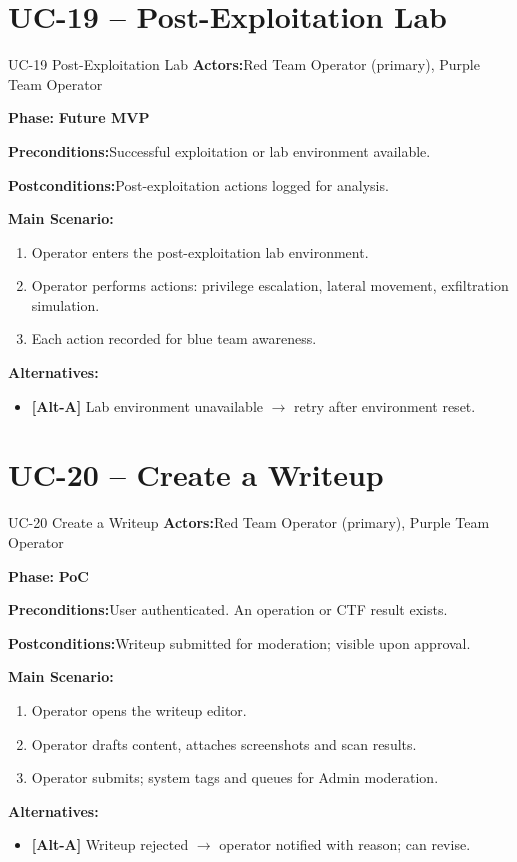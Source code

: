 \documentclass[12pt,a4paper]{report}
\newcommand{\ucfield}[2]{%
    \noindent\textbf{\color{helixpurplemid}#1:}\quad #2\par\medskip
}
\newcommand{\ucphase}[1]{%
    \noindent\textbf{\color{helixpurplemid}Phase:}\quad%
    \ifstrequal{#1}{PoC}{\textcolor{helixteal}{\textbf{PoC}}}{\textcolor{helixamber}{\textbf{Future MVP}}}%
    \par\medskip
}
\begin{document}
\section{UC-19 -- Post-Exploitation Lab}
\begin{ucbox}{UC-19 \quad Post-Exploitation Lab}
    \ucfield{Actors}{Red Team Operator (primary), Purple Team Operator}
    \ucphase{Future MVP}
    \ucfield{Preconditions}{Successful exploitation or lab environment available.}
    \ucfield{Postconditions}{Post-exploitation actions logged for analysis.}
    \textbf{\color{helixpurplemid}Main Scenario:}
    \begin{enumerate}
        \item Operator enters the post-exploitation lab environment.
        \item Operator performs actions: privilege escalation, lateral movement, exfiltration simulation.
        \item Each action recorded for blue team awareness.
    \end{enumerate}
    \textbf{\color{helixpurplemid}Alternatives:}
    \begin{itemize}
        \item \textbf{[Alt-A]} Lab environment unavailable $\rightarrow$ retry after environment reset.
    \end{itemize}
\end{ucbox}

\section{UC-20 -- Create a Writeup}
\begin{ucbox}{UC-20 \quad Create a Writeup}
    \ucfield{Actors}{Red Team Operator (primary), Purple Team Operator}
    \ucphase{PoC}
    \ucfield{Preconditions}{User authenticated. An operation or CTF result exists.}
    \ucfield{Postconditions}{Writeup submitted for moderation; visible upon approval.}
    \textbf{\color{helixpurplemid}Main Scenario:}
    \begin{enumerate}
        \item Operator opens the writeup editor.
        \item Operator drafts content, attaches screenshots and scan results.
        \item Operator submits; system tags and queues for Admin moderation.
    \end{enumerate}
    \textbf{\color{helixpurplemid}Alternatives:}
    \begin{itemize}
        \item \textbf{[Alt-A]} Writeup rejected $\rightarrow$ operator notified with reason; can revise.
    \end{itemize}
\end{ucbox}
\end{document}
